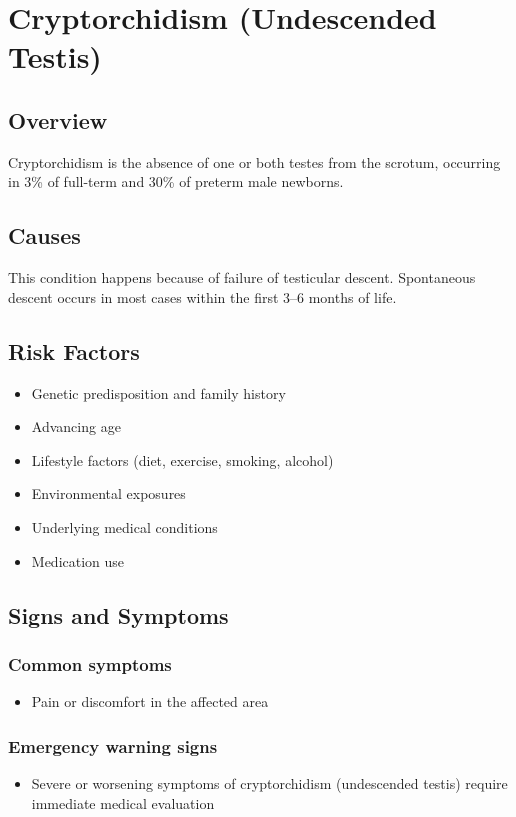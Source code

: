 \chapter{Cryptorchidism (Undescended Testis)}
\label{sec:Cryptorchidism}

\section{Overview}
Cryptorchidism is the absence of one or both testes from the scrotum, occurring in 3\% of full-term and 30\% of preterm male newborns.
\section{Causes}
This condition happens because of failure of testicular descent. Spontaneous descent occurs in most cases within the first 3--6 months of life.     
\section{Risk Factors}

\begin{itemize}[noitemsep]
  \item Genetic predisposition and family history
  \item Advancing age
  \item Lifestyle factors (diet, exercise, smoking, alcohol)
  \item Environmental exposures
  \item Underlying medical conditions
  \item Medication use
\end{itemize}
\section{Signs and Symptoms}

\subsection{Common symptoms}
\begin{itemize}[noitemsep]
  \item Pain or discomfort in the affected area
  \end{itemize}

\subsection{Emergency warning signs}
\begin{itemize}[noitemsep]
  \item Severe or worsening symptoms of cryptorchidism (undescended testis) require immediate medical evaluation
\end{itemize}
